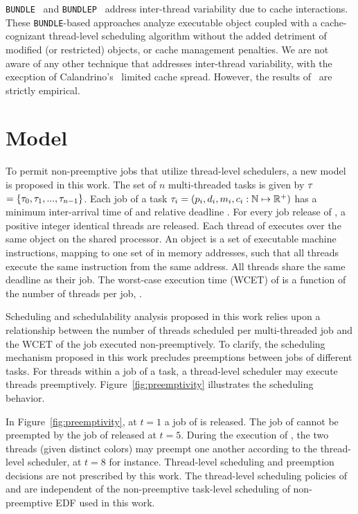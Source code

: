 \documentclass[a4paper,UKenglish,cleveref,autoref,english]{lipics-v2019}
\newcommand{\bundlep}{\texttt{BUNDLEP}}
\newcommand{\bundle}{\texttt{BUNDLE}}
\begin{document}
\bundle{}~\cite{Tessler:2016} and \bundlep{}~\cite{Tessler:2018}
address inter-thread variability due to cache interactions. These
\texttt{BUNDLE}-based approaches analyze executable object coupled
with a cache-cognizant thread-level scheduling algorithm without the
added detriment of modified (or restricted) objects, or cache
management penalties. We are not aware of any other technique that
addresses inter-thread variability, with the execption of
Calandrino's~\cite{Calandrino:2009} limited cache spread. However, the
results of~\cite{Calandrino:2009} are strictly empirical.

\section{Model}
\label{sec:model}

To permit non-preemptive jobs that utilize thread-level schedulers, a
new model is proposed in this work. The set of ${n}$ multi-threaded
tasks is given by ${\tau}$ ${= \{\tau_{0}, \tau_{1}, ...,
\tau_{n-1}\}}$. Each job of a task ${\tau_{i} = (p_{i},
d_{i}, m_{i}, c_i:\mathbb{N} \mapsto
\mathbb{R}^+)}$ has a minimum inter-arrival time of  and
relative deadline . For every job release of , a
positive integer  identical threads are released.  Each
thread of  executes over the same object  on the
shared processor. An object is a set of executable machine
instructions, mapping to one set of in memory addresses, such that all
threads execute the same instruction from the same address. All
threads share the same deadline as their job. The worst-case execution
time (WCET) of  is a function of the number of threads per
job, .

Scheduling and schedulability analysis proposed in this work relies upon
a relationship between the number of threads scheduled per
multi-threaded job and the WCET of the job executed
non-preemptively. To clarify, the scheduling mechanism proposed in
this work precludes preemptions between jobs of different tasks. For
threads within a job of a task, a thread-level scheduler may execute
threads preemptively. Figure~\ref{fig:preemptivity} illustrates the
scheduling behavior.

In Figure~\ref{fig:preemptivity}, at ${t = 1}$ a job of  is
released. The job of  cannot be preempted by the job of  
released at ${t = 5}$. During the execution of , the two
threads (given distinct colors) may preempt one another according to
the thread-level scheduler, at ${t = 8}$ for instance. Thread-level
scheduling and preemption decisions are not prescribed by this
work. The thread-level scheduling policies of  and 
are independent of the non-preemptive task-level scheduling of
non-preemptive EDF used in this work. 
\end{document}
